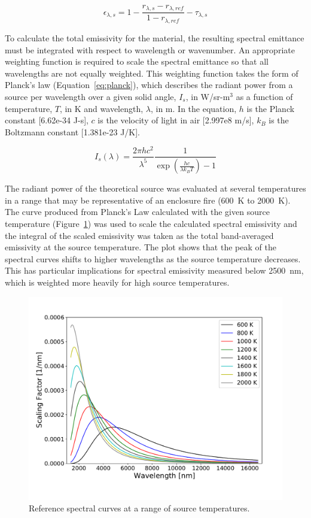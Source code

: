 \documentclass[12pt,oneside]{book}
\begin{document}
\begin{equation}
\epsilon_{\lambda, s} = 1 - \frac{r_{\lambda,s}-r_{\lambda,ref}}{1-r_{\lambda,ref}} - \tau_{\lambda, s} \label{eq:emissivity}
\end{equation}

To calculate the total emissivity for the material, the resulting spectral emittance must be integrated with respect to wavelength or wavenumber. An appropriate weighting function is required to scale the spectral emittance so that all wavelengths are not equally weighted. This weighting function takes the form of Planck's law (Equation~\ref{eq:planck}), which describes the radiant power from a source per wavelength over a given solid angle, $I_s$, in W/sr-m$^3$ as a function of temperature, $T$, in K and wavelength, $\lambda$, in m. In the equation, $h$ is the Planck constant [6.62e-34 J-s], $c$ is the velocity of light in air [2.997e8 m/s], $k_B$ is the Boltzmann constant [1.381e-23 J/K].

\begin{equation}
I_s(\lambda) = \frac{2\pi{h}c^2}{\lambda^5}\frac{1}{\exp\left(\frac{hc}{\lambda{k_B}T}\right)-1} \label{eq:planck}
\end{equation}

The radiant power of the theoretical source was evaluated at several temperatures in a range that may be representative of an enclosure fire (600~K to 2000~K). The curve produced from Planck's Law calculated with the given source temperature (Figure~\ref{fig:reference_spectra}) was used to scale the calculated spectral emissivity and the integral of the scaled emissivity was taken as the total band-averaged emissivity at the source temperature. The plot shows that the peak of the spectral curves shifts to higher wavelengths as the source temperature decreases. This has particular implications for spectral emissivity measured below 2500~nm, which is weighted more heavily for high source temperatures. 

\begin{figure}[!ht]
\centering
\includegraphics[width=.75\columnwidth]{Figures/Nylon_Spectral_Curves.pdf}
\caption[Reference Spectral Curves at a Range of Source Temperatures]{Reference spectral curves at a range of source temperatures.}
\label{fig:reference_spectra}
\end{figure}
\end{document}
